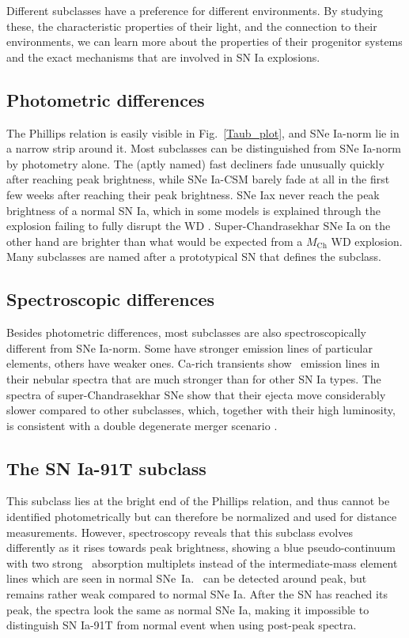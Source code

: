 \documentclass[a4paper,oneside,12pt, class=Latex/Classes/PhDthesisPSnPDF, crop=false]{standalone}
\begin{document}
Different subclasses have a preference for different environments. By studying these, the characteristic properties of their light, and the connection to their environments, we can learn more about the properties of their progenitor systems and the exact mechanisms that are involved in SN Ia explosions.


\subsection{Photometric differences}
The Phillips relation is easily visible in Fig.~\ref{Taub_plot}, and SNe Ia-norm lie in a narrow strip around it. Most subclasses can be distinguished from SNe Ia-norm by photometry alone. The (aptly named) fast decliners fade unusually quickly after reaching peak brightness, while SNe Ia-CSM barely fade at all in the first few weeks after reaching their peak brightness. SNe Iax never reach the peak brightness of a normal SN Ia, which in some models is explained through the explosion failing to fully disrupt the WD \citep{Iax_model_1, Iax_model_2}. Super-Chandrasekhar SNe Ia on the other hand are brighter than what would be expected from a $M_\text{Ch}$ WD explosion. Many subclasses are named after a prototypical SN that defines the subclass.


\subsection{Spectroscopic differences}
Besides photometric differences, most subclasses are also spectroscopically different from SNe Ia-norm. Some have stronger emission lines of particular elements, others have weaker ones. Ca-rich transients \citep[e.g.][]{Ca-rich_2010, Ca_rich_2012, Ca-rich_rate} show \CaII\ emission lines in their nebular spectra that are much stronger than for other SN Ia types. The spectra of super-Chandrasekhar SNe show that their ejecta move considerably slower compared to other subclasses, which, together with their high luminosity, is consistent with a double degenerate merger scenario \citep{2003fg_SuperCh, 06gz_SuperCh, 09dc_SuperCh}.


\subsection{The SN Ia-91T subclass}
This subclass lies at the bright end of the Phillips relation, and thus cannot be identified photometrically but can therefore be normalized and used for distance measurements. However, spectroscopy reveals that this subclass evolves differently as it rises towards peak brightness, showing a blue pseudo-continuum with two strong \FeIII\ absorption multiplets instead of the intermediate-mass element lines which are seen in normal SNe~Ia. \SiII\ can be detected around peak, but remains rather weak compared to normal SNe Ia. After the SN has reached its peak, the spectra look the same as normal SNe Ia, making it impossible to distinguish SN Ia-91T from normal event when using post-peak spectra. 
\end{document}
